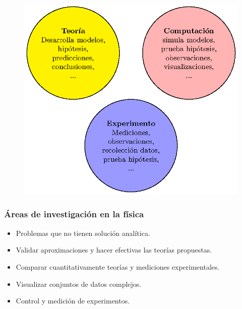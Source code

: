 \begin{frame}[fragile]
\begin{figure}
	\centering
	\includegraphics{Imagenes/figura_04.eps}
\end{figure}
\end{frame}
\begin{frame}
\frametitle{Áreas de investigación en la física}
\begin{itemize}[<+->]
	\item Problemas que no tienen solución analítica.
	\item Validar aproximaciones y hacer efectivas las teorías propuestas.
	\item Comparar cuantitativamente teorías y mediciones experimentales.
	\item Visualizar conjuntos de datos complejos.
	\item Control y medición de experimentos.
\end{itemize}
\end{frame}
